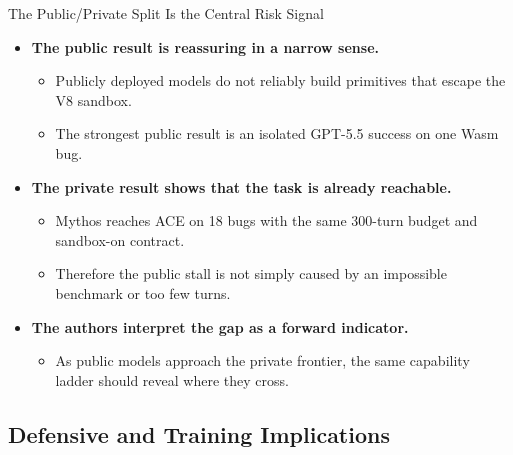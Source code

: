 \documentclass[aspectratio=169,t]{beamer}
\begin{document}
\begin{frame}{The Public/Private Split Is the Central Risk Signal}
  \begin{itemize}
    \item \textbf{The public result is reassuring in a narrow sense.}
      \begin{itemize}
        \item Publicly deployed models do not reliably build primitives that escape the V8 sandbox.
        \item The strongest public result is an isolated GPT-5.5 success on one Wasm bug.
      \end{itemize}
    \item \textbf{The private result shows that the task is already reachable.}
      \begin{itemize}
        \item Mythos reaches ACE on 18 bugs with the same 300-turn budget and sandbox-on contract.
        \item Therefore the public stall is not simply caused by an impossible benchmark or too few turns.
      \end{itemize}
    \item \textbf{The authors interpret the gap as a forward indicator.}
      \begin{itemize}
        \item As public models approach the private frontier, the same capability ladder should reveal where they cross.
      \end{itemize}
  \end{itemize}
\end{frame}

\subsection{Defensive and Training Implications}
\end{document}
